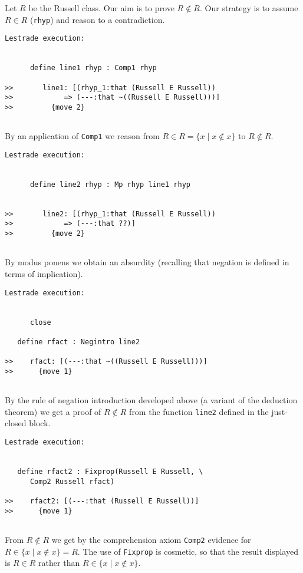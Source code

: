 \documentclass{article}
\begin{document}
Let $R$ be the Russell class.  Our aim is to prove $R \not\in R$.  Our strategy is to assume $R \in R$ ({\tt rhyp}) and
reason to a contradiction.

\begin{verbatim}Lestrade execution:


      define line1 rhyp : Comp1 rhyp

>>       line1: [(rhyp_1:that (Russell E Russell))
>>            => (---:that ~((Russell E Russell)))]
>>         {move 2}


\end{verbatim}

By an application of {\tt Comp1} we reason from $R \in R = \{x \mid x \not\in x\}$ to $R \not\in R$.

\begin{verbatim}Lestrade execution:


      define line2 rhyp : Mp rhyp line1 rhyp


>>       line2: [(rhyp_1:that (Russell E Russell))
>>            => (---:that ??)]
>>         {move 2}


\end{verbatim}

By modus ponens we obtain an absurdity (recalling that negation is defined in terms of implication).

\begin{verbatim}Lestrade execution:


      close

   define rfact : Negintro line2

>>    rfact: [(---:that ~((Russell E Russell)))]
>>      {move 1}


\end{verbatim}
By the rule of negation introduction developed above (a variant of the deduction theorem) we get a proof of $R \not\in R$ from the function {\tt line2}
defined in the just-closed block.

\begin{verbatim}Lestrade execution:


   define rfact2 : Fixprop(Russell E Russell, \
      Comp2 Russell rfact)

>>    rfact2: [(---:that (Russell E Russell))]
>>      {move 1}


\end{verbatim}

From $R \not\in R$ we get by the comprehension axiom {\tt Comp2} evidence for $R \in \{x \mid x \not\in x\}=R$.  The use of {\tt Fixprop} is cosmetic,
so that the result displayed is $R \in R$ rather than $R \in \{x \mid x \not\in x\}$.
\end{document}
